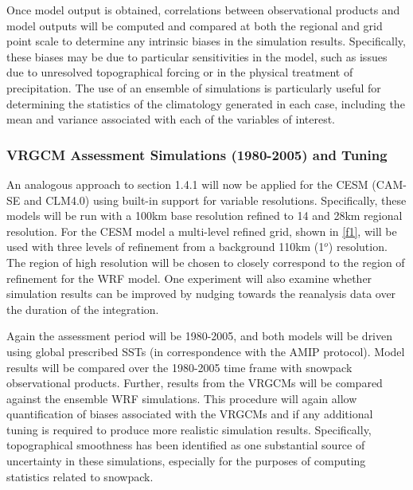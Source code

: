 \documentclass[11pt]{article}
\begin{document}
Once model output is obtained, correlations between observational products and model outputs will be computed and compared at both the regional and grid point scale to determine any intrinsic biases in the simulation results. Specifically, these biases may be due to particular sensitivities in the model, such as issues due to unresolved topographical forcing or in the physical treatment of precipitation. The use of an ensemble of simulations is particularly useful for determining the statistics of the climatology generated in each case, including the mean and variance associated with each of the variables of interest.

\subsubsection{VRGCM Assessment Simulations (1980-2005) and Tuning}
An analogous approach to section 1.4.1 will now be applied  for  the  CESM  (CAM-SE and CLM4.0) using built-in support for variable resolutions.  Specifically, these models will be run with a 100km base resolution refined to 14 and 28km regional resolution. For the CESM model a multi-level refined grid, shown in \ref{f1}, will be used with three levels of refinement from a background 110km (1$^{o}$) resolution. The region of high resolution will be chosen to closely correspond to the region of refinement for the WRF model.  One experiment will also examine whether simulation results can be improved by nudging towards the reanalysis data over the duration of the integration.

Again the assessment period will be 1980-2005, and both models will be driven using global prescribed SSTs (in correspondence with the AMIP protocol). Model results will be compared over the 1980-2005 time frame with snowpack observational products. Further, results from the VRGCMs  will  be  compared against the ensemble WRF simulations. This procedure will again allow quantification of biases associated with the VRGCMs and if any additional tuning is required to produce more realistic simulation results.  Specifically, topographical smoothness has been identified as one substantial source of uncertainty in these simulations, especially for the purposes of computing statistics related to snowpack.
\end{document}
